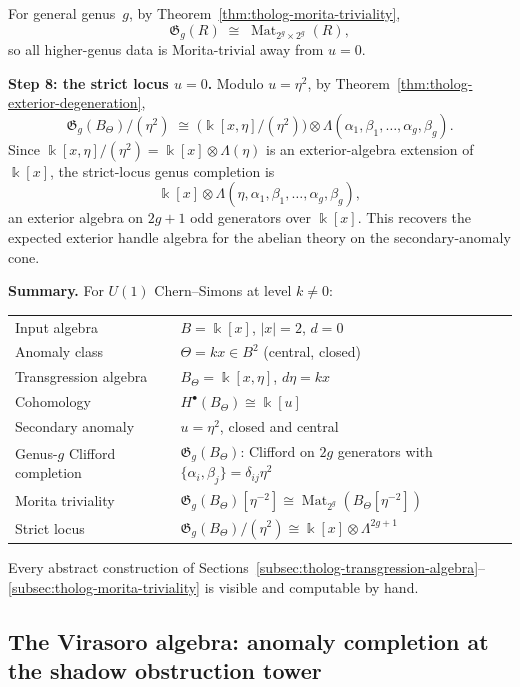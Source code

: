 \begin{example}
For general genus~$g$, by
Theorem~\ref{thm:tholog-morita-triviality},
\[
\mathfrak{G}_g(R)
\;\cong\;
\operatorname{Mat}_{2^g\times 2^g}(R),
\]
so all higher-genus data is Morita-trivial away from $u=0$.

\medskip
\noindent\textbf{Step 8: the strict locus $u=0$.}
Modulo $u=\eta^2$, by Theorem~\ref{thm:tholog-exterior-degeneration},
\[
\mathfrak{G}_g(B_\Theta)/(\eta^2)
\;\cong\;
\bigl(\Bbbk[x,\eta]/(\eta^2)\bigr)
\otimes
\Lambda(\alpha_1,\beta_1,\dots,\alpha_g,\beta_g).
\]
Since $\Bbbk[x,\eta]/(\eta^2)=\Bbbk[x]\otimes\Lambda(\eta)$
is an exterior-algebra extension of $\Bbbk[x]$, the strict-locus
genus completion is
\[
\Bbbk[x]\otimes\Lambda(\eta,\alpha_1,\beta_1,\dots,\alpha_g,\beta_g),
\]
an exterior algebra on $2g+1$ odd generators over $\Bbbk[x]$.
This recovers the expected exterior handle algebra for the abelian
theory on the secondary-anomaly cone.

\medskip
\noindent\textbf{Summary.}
For $U(1)$ Chern--Simons at level $k\neq 0$:
\begin{center}
\renewcommand{\arraystretch}{1.2}
\begin{tabular}{ll}
Input algebra & $B=\Bbbk[x]$, $|x|=2$, $d=0$ \\
Anomaly class & $\Theta=kx\in B^2$ (central, closed) \\
Transgression algebra &
 $B_\Theta=\Bbbk[x,\eta]$, $d\eta=kx$ \\
Cohomology &
 $H^\bullet(B_\Theta)\cong\Bbbk[u]$ \\
Secondary anomaly & $u=\eta^2$, closed and central \\
Genus-$g$ Clifford completion &
 $\mathfrak{G}_g(B_\Theta)$: Clifford on $2g$ generators
 with $\{\alpha_i,\beta_j\}=\delta_{ij}\eta^2$ \\
Morita triviality &
 $\mathfrak{G}_g(B_\Theta)[\eta^{-2}]
 \cong\operatorname{Mat}_{2^g}(B_\Theta[\eta^{-2}])$ \\
Strict locus &
 $\mathfrak{G}_g(B_\Theta)/(\eta^2)
 \cong\Bbbk[x]\otimes\Lambda^{2g+1}$
\end{tabular}
\end{center}
Every abstract construction of
Sections~\ref{subsec:tholog-transgression-algebra}--\ref{subsec:tholog-morita-triviality}
is visible and computable by hand.
\end{example}

\subsection{The Virasoro algebra: anomaly completion
at the shadow obstruction tower}

